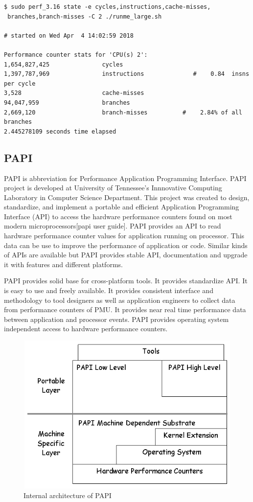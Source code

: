 \begin{lstlisting}
$ sudo perf_3.16 state -e cycles,instructions,cache-misses,
 branches,branch-misses -C 2 ./runme_large.sh

# started on Wed Apr  4 14:02:59 2018 

Performance counter stats for 'CPU(s) 2':     
1,654,827,425      			cycles                        
1,397,787,969      			instructions              #    0.84  insns per cycle                    
3,528     	 				cache-misses                                                       
94,047,959     	 			branches                                                             
2,669,120    	 			branch-misses          #    2.84% of all branches              
2.445278109 seconds time elapsed
\end{lstlisting}

\subsection{PAPI}
PAPI is abbreviation for Performance Application Programming Interface. PAPI project is developed at University of Tennessee's Innnovative Computing Laboratory in Computer Science Department. This project was created to design, standardize, and implement a portable and efficient Application Programming Interface (API) to access the hardware performance counters found on most modern microprocessors[papi user guide]. PAPI provides an API to read hardware performance counter values for application running on processor. This data can be use to improve the performance of application or code. Similar kinds of APIs are available but PAPI provides stable API, documentation and upgrade it with features and different platforms. 

\par PAPI provides solid base for cross-platform tools. It provides standardize API. It is easy to use and freely available. It provides consistent interface and methodology to tool designers as well as application engineers to collect data from performance counters of PMU.  It provides near real time performance data between application and processor events. PAPI provides operating system independent access to hardware performance counters. 

\begin{figure}[h!]
\includegraphics[width=12cm, height=8cm]{./images/papi}
\centering
\caption{Internal architecture of PAPI}
\label{fig:papi}
\end{figure}  

